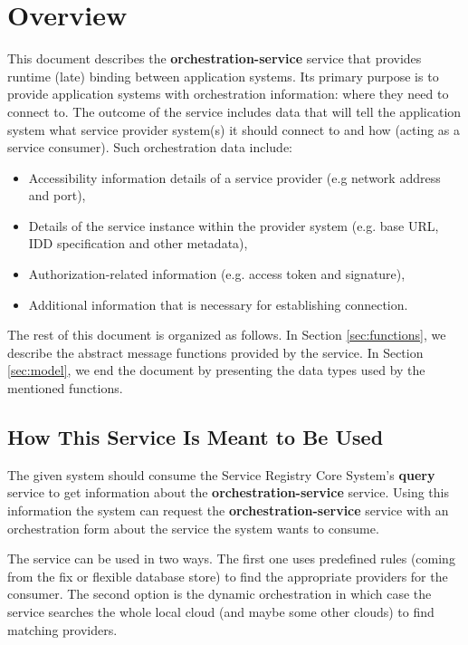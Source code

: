 \documentclass[a4paper]{arrowhead}
\begin{document}
\section{Overview}
\label{sec:overview}
This document describes the \textbf{orchestration-service} service that provides runtime (late) binding between application systems. Its primary purpose is to provide application systems with orchestration information: where they need to connect to. The outcome of the service includes data that will tell the application system what service provider system(s) it should connect to and how (acting as a service consumer). Such orchestration data include:

\begin{itemize}
    \item Accessibility information details of a service provider (e.g network address and port),
    \item Details of the service instance within the provider system (e.g. base URL, IDD specification and other metadata),
    \item Authorization-related information (e.g. access token and signature),
    \item Additional information that is necessary for establishing connection.
\end{itemize}

The rest of this document is organized as follows.
In Section \ref{sec:functions}, we describe the abstract message functions provided by the service.
In Section \ref{sec:model}, we end the document by presenting the data types used by the mentioned functions.

\subsection{How This Service Is Meant to Be Used}
The given system should consume the Service Registry Core System's \textbf{query} service to get information about the \textbf{orchestration-service} service. Using this information the system can request the \textbf{orchestration-service} service with an orchestration form about the service the system wants to consume. 

The service can be used in two ways. The first one uses predefined rules (coming from the fix or flexible database store) to find the appropriate providers for the consumer. The second option is the dynamic orchestration in which case the service searches the whole local cloud (and maybe some other clouds) to find matching providers.
\end{document}
